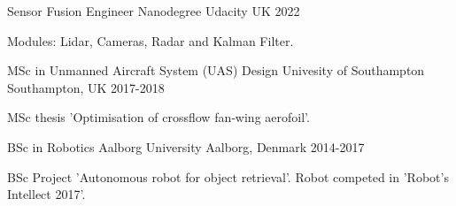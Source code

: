 

\begin{cventries}

  \cventry
    {Sensor Fusion Engineer Nanodegree} %
    {Udacity} %
    {UK} %
    {2022} %
    {
      \begin{cvitems} %
        \item {Modules: Lidar, Cameras, Radar and Kalman Filter.}
      \end{cvitems}
    }
  \cventry
    {MSc in Unmanned Aircraft System (UAS) Design} %
    {Univesity of Southampton} %
    {Southampton, UK} %
    {2017-2018} %
    {
      \begin{cvitems} %
        \item {MSc thesis ’Optimisation of crossflow fan‑wing aerofoil’.}
      \end{cvitems}
    }
  \cventry
    {BSc in Robotics} %
    {Aalborg University} %
    {Aalborg, Denmark} %
    {2014-2017} %
    {
      \begin{cvitems} %
        \item {BSc Project ’Autonomous robot for object retrieval’. Robot competed in ’Robot’s Intellect 2017’.}
      \end{cvitems}
    }
\end{cventries}
